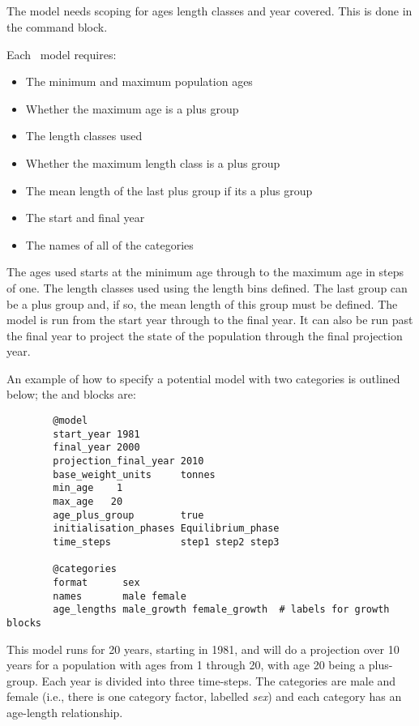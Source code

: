\subsection{}\label{sec:Model}

The model needs scoping for \ifAgeBased ages \else length classes \fi  and year covered. This is done in the  command block.

Each \CNAME\ model requires:

\begin{itemize}
\ifAgeBased
\item The minimum and maximum population ages
\item Whether the maximum age is a plus group
\else 
\item The length classes used
\item Whether the maximum length class is a plus group
\item The mean length of the last plus group if its a plus group
\fi
\item The start and final year
\item The names of all of the categories
\end{itemize}

\ifAgeBased The ages used starts at the minimum age through to the maximum age in steps of one. \else The length classes used using the length bins defined. The last group can be a plus group and, if so, the mean length of this group must be defined. \fi The model is run from the start year through to the final year. It can also be run past the final year to project the state of the population through the final projection year.

An example of how to specify a potential model with two categories is outlined below;  the  and  blocks are:

\ifAgeBased 
{\small{\begin{verbatim}
		@model
		start_year 1981
		final_year 2000
		projection_final_year 2010
		base_weight_units     tonnes
		min_age    1
		max_age   20
		age_plus_group        true
		initialisation_phases Equilibrium_phase
		time_steps            step1 step2 step3

		@categories
		format      sex
		names       male female
		age_lengths male_growth female_growth  # labels for growth blocks
\end{verbatim}}}

This model runs for 20 years, starting in 1981, and will do a projection over 10 years for a population with ages from  1 through 20, with age 20 being a plus-group. Each year is divided into three time-steps. The categories are male and female (i.e., there is one category factor, labelled \textit{sex}) and each category has an age-length relationship.

